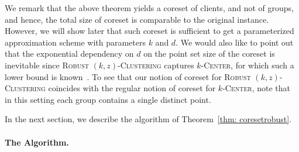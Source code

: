 \documentclass[11pt]{article}
\newcommand{\kc}{\textsc{$k$-Center}\xspace}
\newcommand{\rkc}{\textsc{Robust $(k,z)$-Clustering}\xspace}
\begin{document}
We remark that the above theorem yields a coreset of clients, and not of groups, and hence, the total size of coreset is comparable to the original instance. 
However, we will show later that such coreset is sufficient to get a parameterized approximation scheme with parameters $k$ and $d$.
We would also like to point out that the exponential dependency on $d$ on the point set size of the coreset is inevitable since \rkc captures \kc, for which such a lower bound is known~\cite{braverman2019coresets, pmlr-v119-baker20a}. To see that our notion of coreset for \rkc coincides with the regular notion of coreset for \kc, note that in this setting each group contains a single distinct point.


In the next section, we describe the algorithm of Theorem~\ref{thm: coresetrobust}. 


\paragraph*{The Algorithm.}
\end{document}
